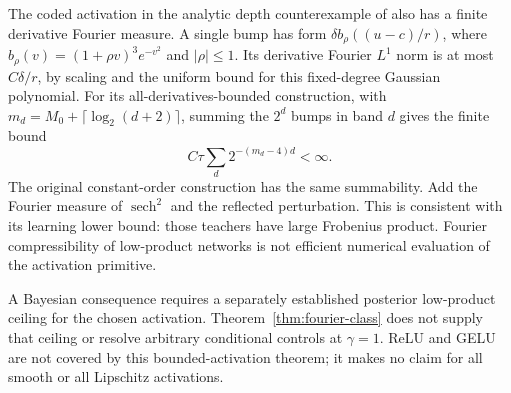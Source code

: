The coded activation in the analytic depth counterexample of
\cite{analytic} also
has a finite derivative Fourier measure. A single bump has form
$\delta b_\rho((u-c)/r)$, where
$b_\rho(v)=(1+\rho v)^3e^{-v^2}$ and $|\rho|\le1$.
Its derivative Fourier $L^1$ norm is at most $C\delta/r$, by scaling
and the uniform bound for this fixed-degree Gaussian polynomial.
For its all-derivatives-bounded construction, with
$m_d=M_0+\lceil\log_2(d+2)\rceil$, summing the $2^d$
bumps in band $d$ gives the finite bound
\[
 C\tau\sum_d2^{-(m_d-4)d}<\infty.
\]
The original constant-order construction has the same summability.
Add the Fourier measure of $\operatorname{sech}^2$ and the reflected
perturbation. This is consistent with its learning lower bound:
those teachers have large Frobenius product. Fourier compressibility
of low-product networks is not efficient numerical evaluation of the
activation primitive.

A Bayesian consequence requires a separately established posterior
low-product ceiling for the chosen activation. Theorem~\ref{thm:fourier-class}
does not supply that ceiling or resolve arbitrary conditional controls
at $\gamma=1$. ReLU and GELU are not covered by this bounded-activation
theorem; it makes no claim for all smooth or all Lipschitz activations.
